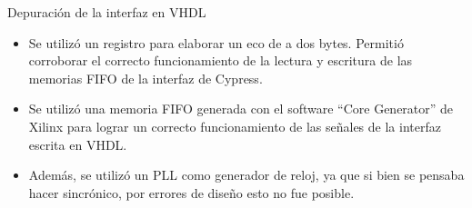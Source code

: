 \begin{frame}{Depuración de la interfaz en VHDL}
	\begin{itemize}
		\item Se utilizó un registro para elaborar un eco de a dos bytes. Permitió corroborar el correcto funcionamiento de la lectura y escritura de las memorias FIFO de la interfaz de Cypress.
		\item Se utilizó una memoria FIFO generada con el software ``Core Generator'' de Xilinx para lograr un correcto funcionamiento de las señales de la interfaz escrita en VHDL.
		\item Además, se utilizó un PLL como generador de reloj, ya que si bien se pensaba hacer sincrónico, por errores de diseño esto no fue posible.
	\end{itemize}
\end{frame}

